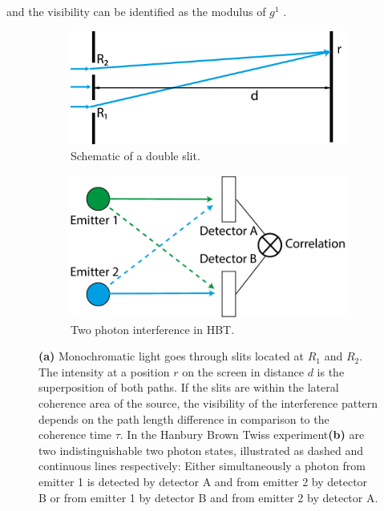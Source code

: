 and the visibility can be identified as the modulus of $g^1$ \cite{loudon2000,ou2017}. 
\begin{figure}
	\centering
	\begin{subfigure}[b]{0.53\textwidth}
	\includegraphics[width=\linewidth]{images/doubleslit.pdf}
	\caption[Schematic of a lit]{Schematic of a double slit.}
	\label{fig:doubleslit}
	\end{subfigure}
\begin{subfigure}[b]{0.41\textwidth}
	\includegraphics[width=\linewidth]{images/correlation.pdf}
	\caption{Two photon interference in HBT.}
	\label{fig:twophoton}
\end{subfigure}
\caption[Schematic of a double slit and two photon interference in  HBT experiments]{\textbf{(a)} Monochromatic light goes through slits located at $R_1$ and $R_2$. The intensity at a position $r$ on the screen in distance $d$ is the superposition of both paths.  If the slits are within the lateral coherence area of the source, the visibility of the interference pattern depends on the path length difference in comparison to the coherence time $\tau$.
In the Hanbury Brown Twiss experiment\textbf{(b)} are two indistinguishable two photon states, illustrated as dashed and  continuous lines respectively: Either simultaneously a photon from emitter 1 is detected by detector A and from emitter 2 by detector B or from emitter 1 by detector B and from emitter 2 by detector A.}
\end{figure}



